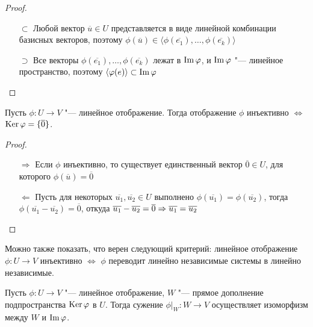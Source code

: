 \begin{proof}~
	\begin{itemize}
		\item[$\subset$] Любой вектор $\overline{u} \in U$ представляется в виде линейной комбинации базисных векторов, поэтому $\phi(\overline{u}) \in \langle \phi(\overline{e_1}), \dots, \phi(\overline{e_k})\rangle$
		
		\item[$\supset$] Все векторы $\phi(\overline{e_1}), \dots, \phi(\overline{e_k})$ лежат в $\operatorname{Im}{\varphi}$, и $\operatorname{Im}{\varphi}$ "--- линейное пространство, поэтому $\langle\varphi(e)\rangle \subset \operatorname{Im}{\varphi}$\qedhere
	\end{itemize}
\end{proof}

\begin{proposition}
	Пусть $\phi: U \rightarrow V$ "--- линейное отображение. Тогда отображение $\phi$ инъективно $\Leftrightarrow$ $\operatorname{Ker}{\varphi} = \{\overline{0}\}$.
\end{proposition}

\begin{proof}~
	\begin{itemize}
		\item[$\Rightarrow$] Если $\phi$ инъективно, то существует единственный вектор $\overline{0} \in U$, для которого $\phi(\overline{u}) = \overline{0}$
		
		\item[$\Leftarrow$] Пусть для некоторых $\overline{u_1}, \overline{u_2} \in U$ выполнено $\phi(\overline{u_1}) = \phi(\overline{u_2})$, тогда $\phi(\overline{u_1} - \overline{u_2}) = \overline{0}$, откуда $\overline{u_1} - \overline{u_2} = \overline 0 \Rightarrow \overline{u_1} = \overline{u_2}$\qedhere
	\end{itemize}
\end{proof}

\begin{note}
	Можно также показать, что верен следующий критерий: линейное отображение $\phi: U \to V$ инъективно $\Leftrightarrow$ $\phi$ переводит линейно независимые системы в линейно независимые.
\end{note}

\begin{proposition}
	Пусть $\phi: U \rightarrow V$ "--- линейное отображение, $W$ "--- прямое дополнение подпространства $\operatorname{Ker}{\varphi}$ в $U$. Тогда сужение $\phi|_W : W \rightarrow V$ осуществляет изоморфизм между $W$ и $\operatorname{Im}{\varphi}$.
\end{proposition}

